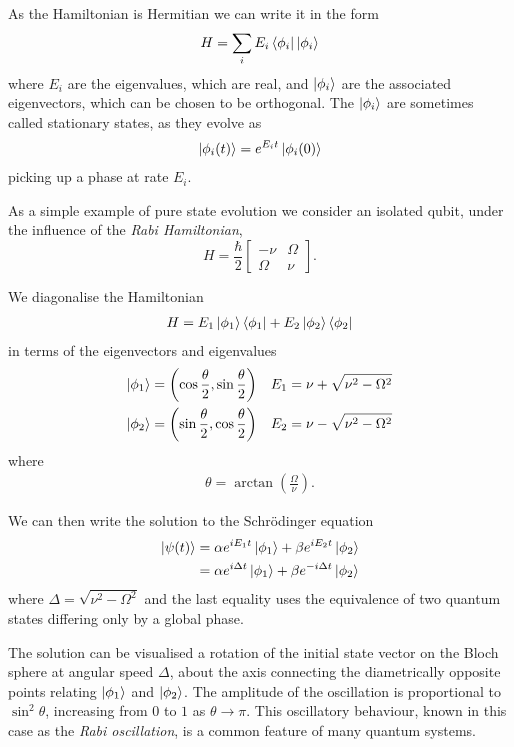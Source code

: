 As the Hamiltonian is Hermitian we can write it in the form
\begin{align}
  H = \sum_i E_i \left\langle \phi_i\right\vert\left\vert\phi_i\right\rangle
\end{align}
where $E_i$ are the eigenvalues, which are real, and $\left\vert\phi_i\right\rangle$ are the associated eigenvectors, which can be chosen to be orthogonal. The $\left\vert\phi_i\right\rangle$ are sometimes called stationary states, as they evolve as
\begin{align}
  \left\vert\phi_i(t)\right\rangle = e^{E_i t}\left\vert\phi_i(0)\right\rangle
\end{align}
picking up a phase at rate $E_i$.

As a simple example of pure state evolution we consider an isolated qubit, under the influence of the \textit{Rabi Hamiltonian},
\begin{equation} \label{rabi_hamiltonian}
  H = \frac{\hbar}{2}
\begin{bmatrix}
  -\nu & \Omega \\
  \Omega & \nu 
\end{bmatrix}.
\end{equation}

We diagonalise the Hamiltonian
\begin{align}
  H = E_1 \left\vert\phi_1\right\rangle\left\langle \phi_1\right\vert + E_2 \left\vert\phi_2\right\rangle\left\langle \phi_2\right\vert
\end{align}
in terms of the eigenvectors and eigenvalues
\begin{align}
  \left\vert\phi_1\right\rangle &=  \left(\cos\frac{\theta}{2}, \sin\frac{\theta}{2}\right)  &E_1 = \nu + \sqrt{\nu^2 - \Omega^2} \\
  \left\vert\phi_2\right\rangle &=  \left(\sin\frac{\theta}{2}, \cos\frac{\theta}{2}\right)  &E_2 = \nu - \sqrt{\nu^2 - \Omega^2} 
\end{align}
where
\begin{align}
  \theta = \arctan\left(\frac{\Omega}{\nu}\right).
\end{align}

We can then write the solution to the Schr\"odinger equation
\begin{align}
  \left\vert\psi(t)\right\rangle &= \alpha e^{iE_1t}\left\vert\phi_1\right\rangle +  \beta e^{iE_2t} \left\vert\phi_2\right\rangle \\
  &= \alpha e^{i\Delta t}\left\vert\phi_1\right\rangle +  \beta e^{- i\Delta t} \left\vert\phi_2\right\rangle 
\end{align}
where $\Delta = \sqrt{\nu^2 - \Omega^2}$ and the last equality uses the equivalence of two quantum states differing only by a global phase. 

The solution can be visualised a rotation of the initial state vector on the Bloch sphere at angular speed $\Delta$, about the axis connecting the diametrically opposite points relating $\left\vert\phi_1\right\rangle$ and $\left\vert\phi_2\right\rangle$. The amplitude of the oscillation is proportional to $\sin^2\theta$, increasing from $0$ to $1$ as $\theta \rightarrow \pi$.  This oscillatory behaviour, known in this case as the \textit{Rabi oscillation}, is a common feature of many quantum systems.

